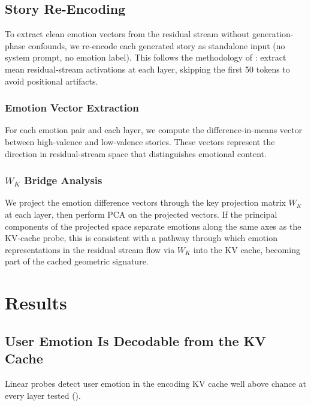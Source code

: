 \documentclass[11pt,a4paper]{article}
\begin{document}
\subsection{Story Re-Encoding}

To extract clean emotion vectors from the residual stream without generation-phase confounds, we re-encode each generated story as standalone input (no system prompt, no emotion label). This follows the methodology of \citet{anthropic2026emotions}: extract mean residual-stream activations at each layer, skipping the first 50 tokens to avoid positional artifacts.

\subsubsection{Emotion Vector Extraction}

For each emotion pair and each layer, we compute the difference-in-means vector between high-valence and low-valence stories. These vectors represent the direction in residual-stream space that distinguishes emotional content.

\subsubsection{$W_K$ Bridge Analysis}

We project the emotion difference vectors through the key projection matrix $W_K$ at each layer, then perform PCA on the projected vectors. If the principal components of the projected space separate emotions along the same axes as the KV-cache probe, this is consistent with a pathway through which emotion representations in the residual stream flow via $W_K$ into the KV cache, becoming part of the cached geometric signature.

\section{Results}

\subsection{User Emotion Is Decodable from the KV Cache}

Linear probes detect user emotion in the encoding KV cache well above chance at every layer tested ().
\end{document}
